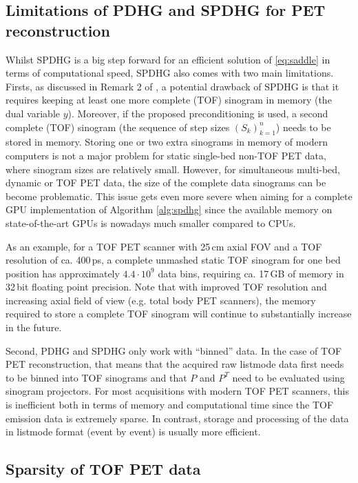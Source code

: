 \subsection*{Limitations of PDHG and SPDHG for PET reconstruction}

Whilst SPDHG is a big step forward for an efficient solution of \eqref{eq:saddle}
in terms of computational speed, SPDHG also comes with two main limitations.
Firsts, as discussed in Remark 2 of \cite{Ehrhardt2019}, 
a potential drawback of SPDHG is that it requires keeping at least one more complete 
(TOF) sinogram in memory (the dual variable $y$). 
Moreover, if the proposed preconditioning is used, a second complete (TOF) sinogram
(the sequence of step sizes $(S_k)_{k=1}^n$) needs to be stored in memory.
Storing one or two extra sinograms in memory of modern computers is not a major problem for static 
single-bed non-TOF PET data, where sinogram sizes are relatively small.
However, for simultaneous multi-bed, dynamic or TOF PET data, the size of the complete data sinograms
can be become problematic.
This issue gets even more severe when aiming for a complete GPU implementation 
of Algorithm \ref{alg:spdhg} since the available memory on state-of-the-art GPUs is nowadays
much smaller compared to CPUs.

As an example, for a TOF PET scanner with 25\,cm axial FOV and a TOF resolution of ca. 400\,ps, 
a complete unmashed static TOF sinogram for one bed position 
has approximately $4.4\cdot10^9$ data bins, requiring ca. 17\,GB of memory in 32\,bit floating
point precision.
Note that with improved TOF resolution and increasing axial field of view (e.g. total body 
PET scanners), the memory required to store a complete TOF sinogram will continue to 
substantially increase in the future.

Second, PDHG and SPDHG only work with ``binned'' data.
In the case of TOF PET reconstruction, that means that the acquired raw listmode data first needs to be
binned into TOF sinograms and that $P$ and $P^T$ need to be evaluated using
sinogram projectors.
For most acquisitions with modern TOF PET scanners, this is inefficient both in terms of memory and
computational time since the TOF emission data is extremely sparse.
In contrast, storage and processing of the data in listmode format (event by event) is usually 
more efficient.

\subsection*{Sparsity of TOF PET data}

